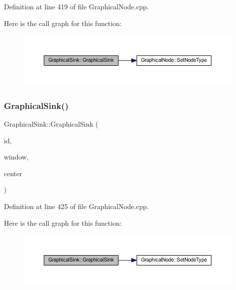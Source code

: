 Definition at line 419 of file Graphical\+Node.\+cpp.

Here is the call graph for this function\+:
\nopagebreak
\begin{figure}[H]
\begin{center}
\leavevmode
\includegraphics[width=350pt]{class_graphical_sink_ab59d3cff17a43fac7fc1f364681cd35f_cgraph}
\end{center}
\end{figure}
\mbox{\label{class_graphical_sink_a2a70f127f23e0e4279b90c565859c7cb}} 
\subsubsection{\texorpdfstring{Graphical\+Sink()}{GraphicalSink()}\hspace{0.1cm}{\footnotesize\ttfamily [2/2]}}
{\footnotesize\ttfamily Graphical\+Sink\+::\+Graphical\+Sink (\begin{DoxyParamCaption}\item[{\hyperlink{_graphical_element_8h_ade5fd6c85839a416577ff9de1605141e}{Element\+Key}}]{id,  }\item[{wx\+Window $\ast$}]{window,  }\item[{wx\+Point2\+D\+Double}]{center }\end{DoxyParamCaption})}



Definition at line 425 of file Graphical\+Node.\+cpp.

Here is the call graph for this function\+:
\nopagebreak
\begin{figure}[H]
\begin{center}
\leavevmode
\includegraphics[width=350pt]{class_graphical_sink_a2a70f127f23e0e4279b90c565859c7cb_cgraph}
\end{center}
\end{figure}


